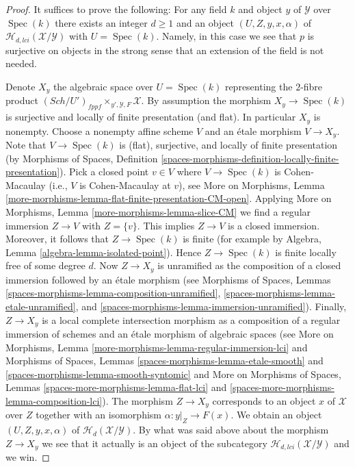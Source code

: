 \documentclass{stacks-project}
\theoremstyle{plain}
\theoremstyle{definition}
\theoremstyle{remark}
\numberwithin{equation}{subsection}
\def\Spec{\mathop{\mathrm{Spec}}}
\def\Sch{\mathit{Sch}}
\begin{document}
\begin{proof}
It suffices to prove the following: For any field $k$
and object $y$ of $\mathcal{Y}$ over $\Spec(k)$ there exists
an integer $d \geq 1$ and an object $(U, Z, y, x, \alpha)$ of
$\mathcal{H}_{d, lci}(\mathcal{X}/\mathcal{Y})$ with $U = \Spec(k)$.
Namely, in this case we see that $p$ is surjective on objects in the
strong sense that an extension of the field is not needed.

\medskip\noindent
Denote $X_y$ the algebraic space over $U = \Spec(k)$
representing the $2$-fibre product
$(\Sch/U')_{fppf} \times_{y', \mathcal{Y}, F} \mathcal{X}$.
By assumption the morphism $X_y \to \Spec(k)$ is surjective and
locally of finite presentation (and flat). In particular $X_y$ is
nonempty. Choose a nonempty affine scheme $V$ and an \'etale morphism
$V \to X_y$. Note that $V \to \Spec(k)$ is (flat), surjective,
and locally of finite presentation (by
Morphisms of Spaces,
Definition \ref{spaces-morphisms-definition-locally-finite-presentation}).
Pick a closed point $v \in V$ where $V \to \Spec(k)$ is Cohen-Macaulay
(i.e., $V$ is Cohen-Macaulay at $v$), see
More on Morphisms,
Lemma \ref{more-morphisms-lemma-flat-finite-presentation-CM-open}.
Applying
More on Morphisms,
Lemma \ref{more-morphisms-lemma-slice-CM}
we find a regular immersion $Z \to V$ with $Z = \{v\}$.
This implies $Z \to V$ is a closed immersion. Moreover, it follows that
$Z \to \Spec(k)$ is finite (for example by
Algebra, Lemma \ref{algebra-lemma-isolated-point}).
Hence $Z \to \Spec(k)$ is finite locally free of some degree $d$.
Now $Z \to X_y$ is unramified as the composition
of a closed immersion followed by an \'etale morphism
(see
Morphisms of Spaces, Lemmas \ref{spaces-morphisms-lemma-composition-unramified},
\ref{spaces-morphisms-lemma-etale-unramified}, and
\ref{spaces-morphisms-lemma-immersion-unramified}).
Finally, $Z \to X_y$ is a local complete intersection morphism
as a composition of a regular immersion of schemes and an \'etale
morphism of algebraic spaces (see
More on Morphisms, Lemma \ref{more-morphisms-lemma-regular-immersion-lci}
and
Morphisms of Spaces, Lemmas \ref{spaces-morphisms-lemma-etale-smooth} and
\ref{spaces-morphisms-lemma-smooth-syntomic} and
More on Morphisms of Spaces,
Lemmas \ref{spaces-more-morphisms-lemma-flat-lci} and
\ref{spaces-more-morphisms-lemma-composition-lci}).
The morphism $Z \to X_y$ corresponds to an object $x$ of $\mathcal{X}$
over $Z$ together with an isomorphism $\alpha : y|_Z \to F(x)$.
We obtain an object $(U, Z, y, x, \alpha)$ of
$\mathcal{H}_d(\mathcal{X}/\mathcal{Y})$. By what was said above about
the morphism $Z \to X_y$ we see that it actually is an object of the
subcategory $\mathcal{H}_{d, lci}(\mathcal{X}/\mathcal{Y})$ and we win.
\end{proof}
\end{document}
